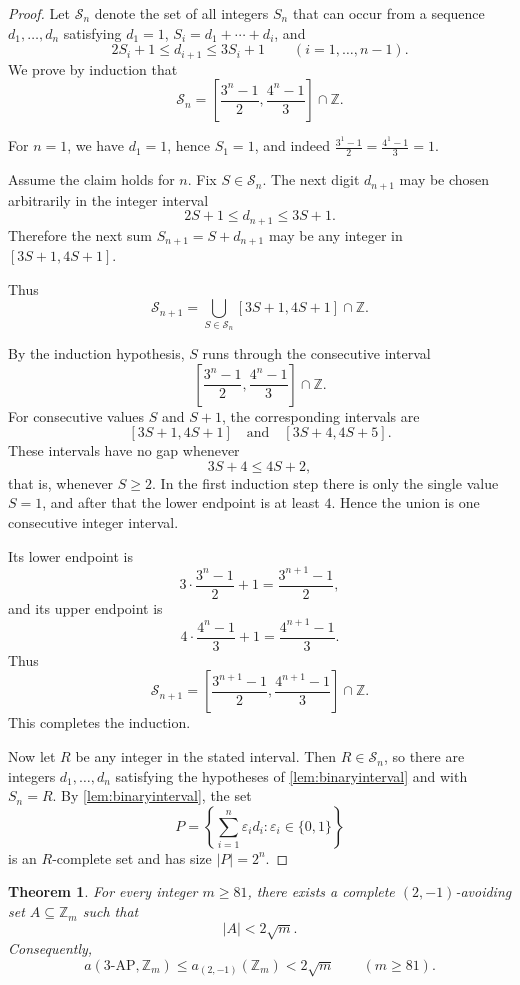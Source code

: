 \documentclass[11pt]{article}
\newtheorem{theorem}{Theorem}[section]
\newcommand{\Z}{\mathbb Z}
\newcommand{\AP}{\mathrm{AP}}
\newcommand{\aavo}{a_{(2,-1)}}
\begin{document}
	\begin{proof}
		Let $\mathcal S_n$ denote the set of all integers $S_n$ that can occur from a sequence $d_1,\ldots,d_n$ satisfying $d_1=1$, $S_i=d_1+\cdots+d_i$, and
		\[
		2S_i+1\le d_{i+1}\le 3S_i+1
		\qquad (i=1,\ldots,n-1).
		\]
		We prove by induction that
		\[
		\mathcal S_n=
		\left[
		\frac{3^n-1}{2},
		\frac{4^n-1}{3}
		\right]\cap\Z .
		\]
		
		For $n=1$, we have $d_1=1$, hence $S_1=1$, and indeed
		$\frac{3^1-1}{2}=\frac{4^1-1}{3}=1.$
		
		Assume the claim holds for $n$.  Fix $S\in\mathcal S_n$.  The next digit $d_{n+1}$ may be chosen arbitrarily in the integer interval
		\[
		2S+1\le d_{n+1}\le 3S+1.
		\]
		Therefore the next sum
		$ S_{n+1}=S+d_{n+1}$
		may be any integer in
		$ [3S+1,4S+1].$
		
		Thus
		\[
		\mathcal S_{n+1}
		=
		\bigcup_{S\in\mathcal S_n}
		[3S+1,4S+1]\cap\Z .
		\]
		
		By the induction hypothesis, $S$ runs through the consecutive interval
		\[
		\left[
		\frac{3^n-1}{2},
		\frac{4^n-1}{3}
		\right]\cap\Z .
		\]
		For consecutive values $S$ and $S+1$, the corresponding intervals are
		\[
		[3S+1,4S+1]
		\quad\text{and}\quad
		[3S+4,4S+5].
		\]
		These intervals have no gap whenever
		\[
		3S+4\le4S+2,
		\]
		that is, whenever $S\ge2$.  In the first induction step there is only the single value $S=1$, and after that the lower endpoint is at least $4$.  Hence the union is one consecutive integer interval.
		
		Its lower endpoint is
		\[
		3\cdot\frac{3^n-1}{2}+1
		=
		\frac{3^{n+1}-1}{2},
		\]
		and its upper endpoint is
		\[
		4\cdot\frac{4^n-1}{3}+1
		=
		\frac{4^{n+1}-1}{3}.
		\]
		Thus
		\[
		\mathcal S_{n+1}
		=
		\left[
		\frac{3^{n+1}-1}{2},
		\frac{4^{n+1}-1}{3}
		\right]\cap\Z .
		\]
		This completes the induction.
		
		Now let $R$ be any integer in the stated interval.  Then $R\in\mathcal S_n$, so there are integers $d_1,\ldots,d_n$ satisfying the hypotheses of \cref{lem:binaryinterval} and with $S_n=R$.  By \cref{lem:binaryinterval}, the set
		\[
		P=\left\{\sum_{i=1}^n \varepsilon_i d_i:
		\varepsilon_i\in\{0,1\}\right\}
		\]
		is an $R$-complete set  and has size  $|P|=2^n$.
	\end{proof}
	
	\begin{theorem}\label{thm:threshold81}
		For every integer $m\ge81$, there exists a complete $(2,-1)$-avoiding set $A\subseteq\Z_m$ such that
		\[
		|A|<2\sqrt m .
		\]
		Consequently,
		\[
		a(3\text{-}\AP,\Z_m)
		\le
		\aavo(\Z_m)
		<
		2\sqrt m
		\qquad (m\ge81).
		\]
	\end{theorem}
	
\end{document}
